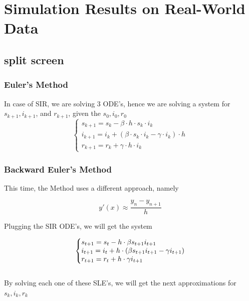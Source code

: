 \documentclass{beamer}
\makeatletter
\newenvironment{system}%
{\left\lbrace\begin{array}{@{}l@{}}}%
{\end{array}\right.}
\makeatother
\begin{document}
\section{Simulation Results on Real-World Data}
\subsection{split screen}

\begin{frame}\frametitle{Euler's Method}
In case of SIR, we are solving 3 ODE's, hence we are solving a system
for $s_{k+1}, i_{k+1}$, and $r_{k+1}$, given the $s_0, i_0, r_0$
\vspace{0.7cm}
\Large
\[
	\left\{
		\begin{array}{l}
			s_{k+1}=s_k - \beta \cdot h \cdot s_k \cdot i_k \\
			i_{k+1}=i_k + (\beta \cdot s_k \cdot i_k - \gamma \cdot i_k) \cdot h \\
			r_{k+1}=r_k+ \gamma \cdot h \cdot i_k
		\end{array}
	\right.
\]
\end{frame}

\begin{frame}\frametitle{Backward Euler's Method}

This time, the Method uses a different approach, namely

\begin{equation*}
	y'(x) \approx \frac{y_n-y_{n+1}}{h}
\end{equation*}

Plugging the SIR ODE's, we will get the system

    \begin{equation*}
        \begin{system}
        s_{t+1} = s_t - h \cdot \beta s_{t+1} i_{t+1}
        \\
        i_{t+1} = i_t + h \cdot (\beta s_{t+1} i_{t+1} - \gamma i_{t+1})
        \\
        r_{t+1}= r_t + h\cdot \gamma i_{t+1}
        \end{system}
    \end{equation*}
    \vspace{0.3cm}
\\
    By solving each one of these SLE's, we will get the next approximations for $s_k,i_k,r_k$
\end{frame}
\end{document}
